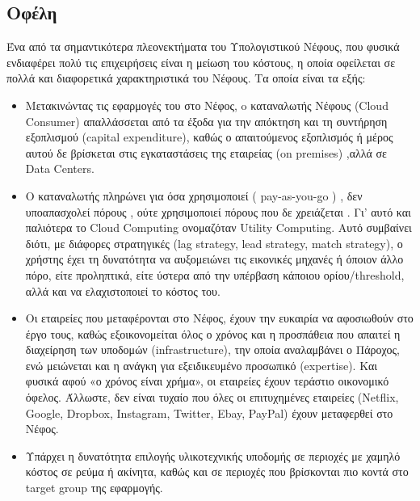 \documentclass{article}
\begin{document}
\subsection{Οφέλη}
Ένα από τα σημαντικότερα πλεονεκτήματα του Υπολογιστικού Νέφους, που φυσικά ενδιαφέρει πολύ τις επιχειρήσεις είναι η μείωση του κόστους, η οποία οφείλεται σε πολλά και διαφορετικά χαρακτηριστικά του Νέφους. Τα οποία είναι τα εξής:
\begin{itemize}
\item	Μετακινώντας τις εφαρμογές του στο Νέφος, o καταναλωτής Νέφους (Cloud Consumer) απαλλάσσεται από τα έξοδα για την απόκτηση και τη συντήρηση εξοπλισμού (capital expenditure), καθώς ο απαιτούμενος εξοπλισμός ή μέρος αυτού δε βρίσκεται στις εγκαταστάσεις της εταιρείας (on premises) ,αλλά σε Data Centers.

\item	Ο καταναλωτής πληρώνει για όσα χρησιμοποιεί ( pay-as-you-go ) , δεν υποαπασχολεί πόρους , ούτε χρησιμοποιεί πόρους που δε χρειάζεται . Γι’ αυτό και παλιότερα το Cloud Computing ονομαζόταν Utility Computing. Αυτό συμβαίνει διότι, με διάφορες στρατηγικές (lag strategy, lead strategy, match strategy), ο χρήστης έχει τη δυνατότητα να αυξομειώνει τις εικονικές μηχανές ή όποιον άλλο πόρο, είτε προληπτικά, είτε ύστερα από την υπέρβαση κάποιου ορίου/threshold, αλλά και να ελαχιστοποιεί το κόστος του.

\item	Οι εταιρείες που μεταφέρονται στο Νέφος, έχουν την ευκαιρία να αφοσιωθούν στο έργο τους, καθώς εξοικονομείται όλος ο χρόνος και η προσπάθεια που απαιτεί η διαχείρηση των υποδομών (infrastructure), την οποία αναλαμβάνει ο Πάροχος, ενώ μειώνεται και η ανάγκη για εξειδικευμένο προσωπικό (expertise). Και φυσικά αφού «ο χρόνος είναι χρήμα», οι εταιρείες έχουν τεράστιο οικονομικό όφελος. Άλλωστε, δεν είναι τυχαίο που όλες οι επιτυχημένες εταιρείες (Netflix, Google, Dropbox, Instagram, Twitter, Ebay, PayPal) έχουν μεταφερθεί στο Νέφος.

\item	Υπάρχει η δυνατότητα επιλογής υλικοτεχνικής υποδομής σε περιοχές με χαμηλό κόστος σε ρεύμα ή ακίνητα, καθώς και σε περιοχές που βρίσκονται πιο κοντά στο target group της εφαρμογής.

\end{itemize}
\end{document}
